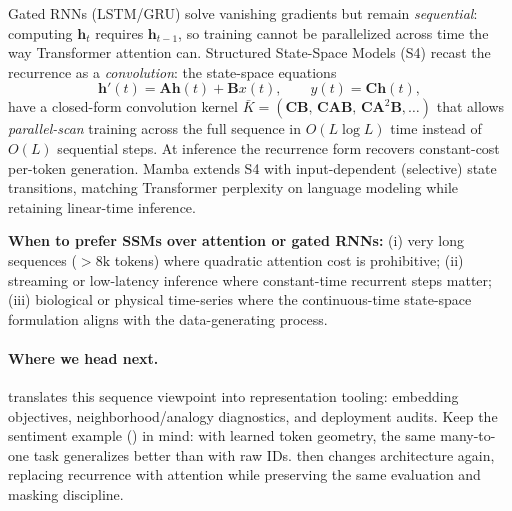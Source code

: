 \begin{tcolorbox}[summarybox, title={Beyond gated RNNs: state-space models (S4, Mamba)}]
Gated RNNs (LSTM/GRU) solve vanishing gradients but remain \emph{sequential}: computing \(\mathbf{h}_t\) requires \(\mathbf{h}_{t-1}\), so training cannot be parallelized across time the way Transformer attention can. Structured State-Space Models (S4) recast the recurrence as a \emph{convolution}: the state-space equations
\[
  \mathbf{h}'(t) = \mathbf{A}\mathbf{h}(t) + \mathbf{B}x(t),
  \qquad
  y(t) = \mathbf{C}\mathbf{h}(t),
\]
have a closed-form convolution kernel \(\bar{K} = (\mathbf{C}\mathbf{B},\, \mathbf{C}\mathbf{A}\mathbf{B},\, \mathbf{C}\mathbf{A}^2\mathbf{B}, \ldots)\) that allows \emph{parallel-scan} training across the full sequence in \(O(L \log L)\) time instead of \(O(L)\) sequential steps. At inference the recurrence form recovers constant-cost per-token generation. Mamba \citep{Gu2023Mamba} extends S4 with input-dependent (selective) state transitions, matching Transformer perplexity on language modeling while retaining linear-time inference.

\textbf{When to prefer SSMs over attention or gated RNNs:} (i) very long sequences (\(>8\mathrm{k}\) tokens) where quadratic attention cost is prohibitive; (ii) streaming or low-latency inference where constant-time recurrent steps matter; (iii) biological or physical time-series where the continuous-time state-space formulation aligns with the data-generating process.
\end{tcolorbox}

\medskip
\paragraph{Where we head next.}  translates this sequence viewpoint into representation tooling: embedding objectives, neighborhood/analogy diagnostics, and deployment audits. Keep the sentiment example () in mind: with learned token geometry, the same many\hyp{}to\hyp{}one task generalizes better than with raw IDs.  then changes architecture again, replacing recurrence with attention while preserving the same evaluation and masking discipline.

\nocite{JurafskyMartin2023, Goodfellow2016, Mikolov2010, LevyGoldberg2014}
